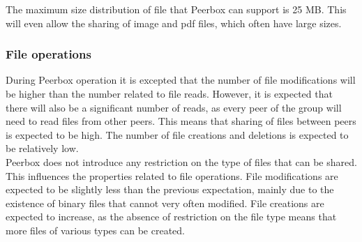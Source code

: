 The maximum size distribution of file that Peerbox can support is 25 MB. This will even allow the sharing of image and pdf files, which often have large sizes.

\subsubsection{File operations}

During Peerbox operation it is excepted that the number of file modifications will be higher than the number related  to file reads. However, it is expected that there will also be a significant number of reads, as every peer of the group will need to read files from other peers. This means that sharing of files between peers is expected to be high. The number of file creations and deletions is expected to be relatively low.\\

Peerbox does not introduce any restriction on the type of files that can be shared. This influences the properties related to file operations. File modifications are expected to be slightly less than the previous expectation, mainly due to the existence of binary files that cannot very often modified. File creations are expected to increase, as the absence of restriction on the file type means that more files of various types can be created.